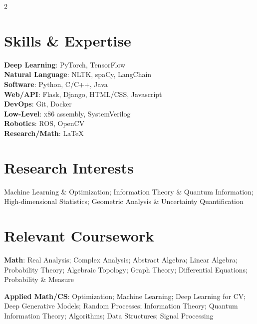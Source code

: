 \documentclass[letterpaper,10pt]{article}
\begin{document}
\setlength{\columnsep}{1.15cm}
\begin{paracol}{2}
    
    
    \section{Skills \& Expertise}
    \textbf{Deep Learning}: PyTorch, TensorFlow\\
    \textbf{Natural Language}: NLTK, spaCy, LangChain\\
    \textbf{Software}: Python, C/C++, Java\\
    \textbf{Web/API}: Flask, Django, HTML/CSS, Javascript\\
    \textbf{DevOps}: Git, Docker\\
    \textbf{Low-Level}: x86 assembly, SystemVerilog\\
    \textbf{Robotics}: ROS, OpenCV\\
    \textbf{Research/Math}: \LaTeX\\

    \vspace{-10pt}

    \section{Research Interests}
    Machine Learning \& Optimization; Information Theory \& Quantum Information; High-dimensional Statistics; Geometric Analysis \& Uncertainty Quantification \\
    
    \vspace{-10pt}

    \section{Relevant Coursework}
    \raggedright\textbf{Math}: Real Analysis; Complex Analysis; Abstract Algebra; Linear Algebra; Probability Theory; Algebraic Topology; Graph Theory; Differential Equations; Probability \& Measure \\
    \vspace{10pt}
    \raggedright\textbf{Applied Math/CS}: Optimization; Machine Learning; Deep Learning for CV; Deep Generative Models; Random Processes; Information Theory; Quantum Information Theory; Algorithms; Data Structures; Signal Processing \\


\end{paracol}
\end{document}
